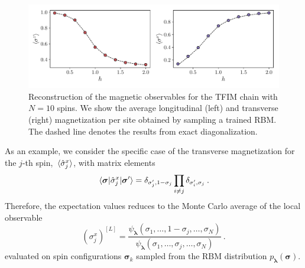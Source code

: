 \documentclass[submission, Phys, hidelnks]{SciPost}
\begin{document}
\begin{figure}[t]
    \centering{}
    \includegraphics[width=\columnwidth, trim={0 15 0 0}, clip]{obs.pdf}
    \caption{
        Reconstruction of the magnetic observables for the TFIM chain with
        $N=10$ spins. We show the average longitudinal (left) and transverse
        (right) magnetization per site obtained by sampling a trained RBM.\@
        The dashed line denotes the results from exact diagonalization.
    }\label{tfim_magn}
\end{figure}

As an example, we consider the specific case of the transverse magnetization
for the $j$-th spin, $\ev*{\hat{\sigma}^x_j}$, with matrix elements
\begin{equation}
    \mel{\bm{\sigma}}{\hat{\sigma}^x_j}{\bm{\sigma}^{\prime}}=\delta_{\sigma_j^\prime,1-\sigma_j}\prod_{i\ne j}\delta_{\sigma_i^\prime,\sigma_j}\:.
\end{equation}
Therefore, the expectation values reduces to the Monte Carlo average of the
local observable
\begin{equation}
    {(\sigma^x_j)}^{[L]}=\frac{\psi_{\bm{\lambda}}(\sigma_1,\dots,1-\sigma_j,\dots,\sigma_N)}
    {\psi_{\bm{\lambda}}(\sigma_1,\dots,\sigma_j,\dots,\sigma_N)}
\:.
\end{equation}
evaluated on spin configurations $\bm{\sigma}_k$ sampled from the RBM
distribution $p_{\bm{\lambda}}(\bm{\sigma})$.
\end{document}
